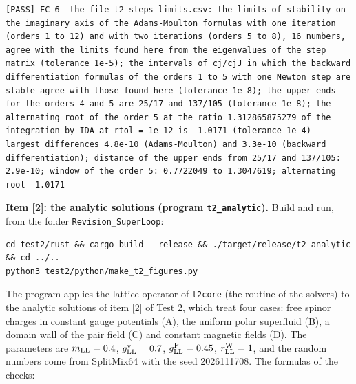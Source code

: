 \documentclass[
  10pt,
]{article}
\begin{document}
\begin{verbatim}
[PASS] FC-6  the file t2_steps_limits.csv: the limits of stability on the imaginary axis of the Adams-Moulton formulas with one iteration (orders 1 to 12) and with two iterations (orders 5 to 8), 16 numbers, agree with the limits found here from the eigenvalues of the step matrix (tolerance 1e-5); the intervals of cj/cjJ in which the backward differentiation formulas of the orders 1 to 5 with one Newton step are stable agree with those found here (tolerance 1e-8); the upper ends for the orders 4 and 5 are 25/17 and 137/105 (tolerance 1e-8); the alternating root of the order 5 at the ratio 1.312865875279 of the integration by IDA at rtol = 1e-12 is -1.0171 (tolerance 1e-4)  -- largest differences 4.8e-10 (Adams-Moulton) and 3.3e-10 (backward differentiation); distance of the upper ends from 25/17 and 137/105: 2.9e-10; window of the order 5: 0.7722049 to 1.3047619; alternating root -1.0171
\end{verbatim}

\textbf{Item {[}2{]}: the analytic solutions (program
\texttt{t2\_analytic}).} Build and run, from the folder
\texttt{Revision\_SuperLoop}:

\begin{verbatim}
cd test2/rust && cargo build --release && ./target/release/t2_analytic && cd ../..
python3 test2/python/make_t2_figures.py
\end{verbatim}

The program applies the lattice operator of \texttt{t2core} (the routine
of the solvers) to the analytic solutions of item {[}2{]} of Test 2,
which treat four cases: free spinor charges in constant gauge potentials
(A), the uniform polar superfluid (B), a domain wall of the pair field
(C) and constant magnetic fields (D). The parameters are
\(m_{\rm LL}=0.4\), \(g^{\rm v}_{\rm LL}=0.7\),
\(g^{\rm F}_{\rm LL}=0.45\), \(r^{\rm W}_{\rm LL}=1\), and the random
numbers come from SplitMix64 with the seed 2026111708. The formulas of
the checks:
\end{document}
